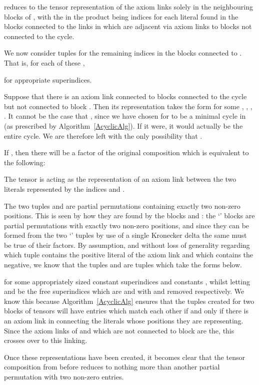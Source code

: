 \documentclass{LMCS}
\theoremstyle{plain}\newtheorem*{cLm}{Claim}
\newcommand{\p}{} \newcommand{\N}{\mathbb{N}}
\begin{document}
reduces to the tensor representation of the axiom links solely in the neighbouring blocks of , with the  in the product being indices for each literal found in the blocks connected to the links in  which are adjacent via axiom links to blocks not connected to the cycle.

We now consider tuples  for the remaining indices in the blocks connected to . That is, for each of these ,

for appropriate superindices.

\p Suppose that there is an axiom link connected to blocks connected to the cycle  but not connected to block . Then its representation takes the form  for some , , , . It cannot be the case that , since we have chosen for  to be a minimal cycle in  (as prescribed by Algorithm~\ref{AcyclicAlg}). If it were, it would actually be the entire cycle. We are therefore left with the only possibility that .




If , then there will be a factor of the original composition which is equivalent to the following:

The tensor  is acting as the representation of an axiom link between the two literals represented by the indices  and .

\p The two tuples  and  are partial permutations containing exactly two non-zero positions. This is seen by how they are found by the blocks  and : the `' blocks are partial permutations with exactly two non-zero positions, and since they can be formed from the two `' tuples by use of a single Kronecker delta the same must be true of their factors. By assumption, and without loss of generality regarding which tuple contains the positive literal of the axiom link and which contains the negative, we know that the tuples  and  are tuples which take the forms below.

for some appropriately sized constant superindices  and constants , whilst letting  and  be the free superindices which are  and  with  and  removed respectively. We know this because Algorithm~\ref{AcyclicAlg} ensures that the tuples created for two blocks of tensors will have entries which match each other if and only if there is an axiom link in  connecting the literals whose positions they are representing. Since the axiom links of  and  which are not connected to block  are the, this crosses over to this linking.

\p Once these representations have been created, it becomes clear that the tensor composition from before reduces to nothing more than another partial permutation with two non-zero entries.
\end{document}
